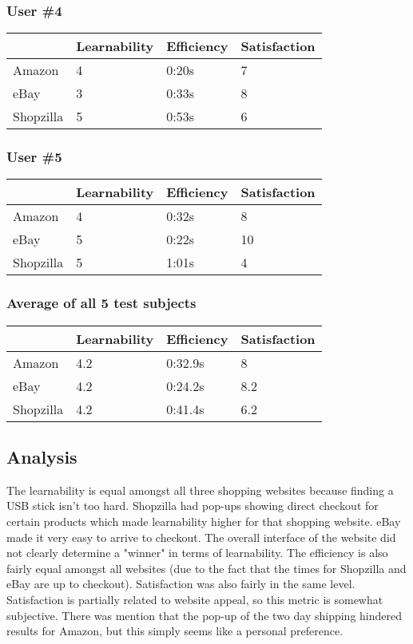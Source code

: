 \documentclass[11pt, oneside]{article}   	%
\begin{document}
\subsubsection{User \#4}

\begin{tabular}{| l | l | l | l |}
    \hline
     & Learnability & Efficiency & Satisfaction \\ \hline
    Amazon & 4 & 0:20s & 7 \\ \hline
    eBay & 3 & 0:33s & 8 \\ \hline
    Shopzilla & 5 & 0:53s & 6 \\\hline
\end{tabular}

\subsubsection{User \#5}

\begin{tabular}{| l | l | l | l |}
    \hline
     & Learnability & Efficiency & Satisfaction \\ \hline
    Amazon & 4 & 0:32s & 8 \\ \hline
    eBay & 5 & 0:22s & 10 \\ \hline
    Shopzilla & 5 & 1:01s & 4 \\\hline
\end{tabular}

\subsubsection{Average of all 5 test subjects}

\begin{tabular}{| l | l | l | l |}
    \hline
     & Learnability & Efficiency & Satisfaction \\ \hline
    Amazon & 4.2 & 0:32.9s & 8 \\ \hline
    eBay & 4.2 & 0:24.2s & 8.2 \\ \hline
    Shopzilla & 4.2 & 0:41.4s & 6.2 \\\hline
\end{tabular}

\subsection{Analysis}

The learnability is equal amongst all three shopping websites because finding a USB stick isn't too hard. Shopzilla had pop-ups showing direct checkout for certain products which made learnability higher for that shopping website. eBay made it very easy to arrive to checkout. The overall interface of the website did not clearly determine a "winner" in terms of learnability. The efficiency is also fairly equal amongst all websites (due to the fact that the times for Shopzilla and eBay are up to checkout). Satisfaction was also fairly in the same level. Satisfaction is partially related to website appeal, so this metric is somewhat subjective. There was mention that the pop-up of the two day shipping hindered results for Amazon, but this simply seems like a personal preference.
\end{document}
